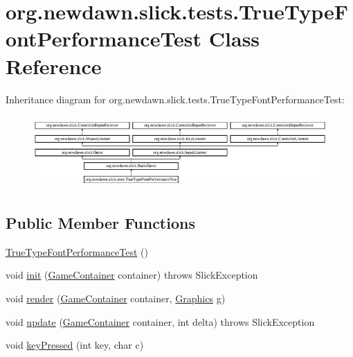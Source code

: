 \hypertarget{classorg_1_1newdawn_1_1slick_1_1tests_1_1_true_type_font_performance_test}{}\section{org.\+newdawn.\+slick.\+tests.\+True\+Type\+Font\+Performance\+Test Class Reference}
\label{classorg_1_1newdawn_1_1slick_1_1tests_1_1_true_type_font_performance_test}
Inheritance diagram for org.\+newdawn.\+slick.\+tests.\+True\+Type\+Font\+Performance\+Test\+:\begin{figure}[H]
\begin{center}
\leavevmode
\includegraphics[height=2.802803cm]{classorg_1_1newdawn_1_1slick_1_1tests_1_1_true_type_font_performance_test}
\end{center}
\end{figure}
\subsection*{Public Member Functions}
\begin{DoxyCompactItemize}
\item 
\mbox{\hyperlink{classorg_1_1newdawn_1_1slick_1_1tests_1_1_true_type_font_performance_test_abad65130b826467e018e29fecca8ced3}{True\+Type\+Font\+Performance\+Test}} ()
\item 
void \mbox{\hyperlink{classorg_1_1newdawn_1_1slick_1_1tests_1_1_true_type_font_performance_test_a5b9af3a167f28a66f87e462ce698c2d7}{init}} (\mbox{\hyperlink{classorg_1_1newdawn_1_1slick_1_1_game_container}{Game\+Container}} container)  throws Slick\+Exception 
\item 
void \mbox{\hyperlink{classorg_1_1newdawn_1_1slick_1_1tests_1_1_true_type_font_performance_test_a6bc885506e3a3dc033a9333b303ec80e}{render}} (\mbox{\hyperlink{classorg_1_1newdawn_1_1slick_1_1_game_container}{Game\+Container}} container, \mbox{\hyperlink{classorg_1_1newdawn_1_1slick_1_1_graphics}{Graphics}} g)
\item 
void \mbox{\hyperlink{classorg_1_1newdawn_1_1slick_1_1tests_1_1_true_type_font_performance_test_a86f3d4df072362a3725c116eccf37a39}{update}} (\mbox{\hyperlink{classorg_1_1newdawn_1_1slick_1_1_game_container}{Game\+Container}} container, int delta)  throws Slick\+Exception 
\item 
void \mbox{\hyperlink{classorg_1_1newdawn_1_1slick_1_1tests_1_1_true_type_font_performance_test_a1e792d6bbd471d4867f7776c7b2bba6e}{key\+Pressed}} (int key, char c)
\end{DoxyCompactItemize}
